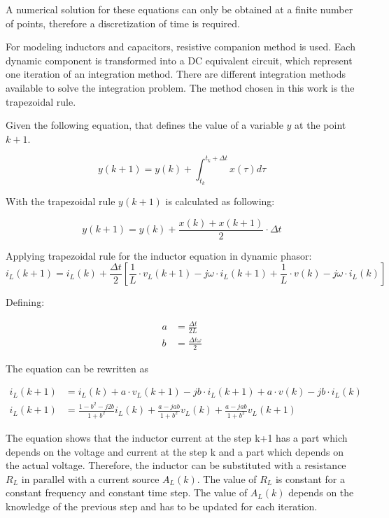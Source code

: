 A numerical solution for these equations can only be obtained at a finite number of points, therefore a discretization of time is required.

For modeling inductors and capacitors, resistive companion method is used. Each dynamic component is transformed into a DC equivalent circuit, which represent one iteration of an integration method.
There are different integration methods available to solve the integration problem. The method chosen in this work is the trapezoidal rule.

Given the following equation, that defines the value of a variable $y$ at the point $k+1$.

\begin{equation}
	y(k+1) = y(k) + \int_{t_k}^{t_k+ \Delta t} x(\tau)d \tau
\end{equation}

With the trapezoidal rule $y(k+1)$ is calculated as following:

\begin{equation}
	y(k+1)=y(k)+ \frac{x(k)+x(k+1)}{2} \cdot \Delta t
\end{equation}

Applying trapezoidal rule for the inductor equation in dynamic phasor:
\begin{equation}
        i_L(k+1) = i_L(k) + \frac{\Delta t}{2} \left[ \frac{1}{L} \cdot v_L(k+1) - j \omega \cdot i_L(k+1) + \frac{1}{L} \cdot v(k) - j \omega \cdot i_L(k) \right]
\end{equation}

Defining:

\begin{align}
	a &= \frac{\Delta t}{2L} \\
	b &= \frac{\Delta t \omega}{2}
\end{align}
		
The equation can be rewritten as

\begin{align}
        i_L(k+1) &= i_L(k) + a \cdot v_L(k+1) - j b \cdot i_L(k+1) + a \cdot v(k) - j b \cdot i_L(k) \\
        i_L(k+1) &= \frac{1-b^2-j2b}{1+b^2}i_L(k) + \frac{a-jab}{1+b^2} v_L(k) + \frac{a-jab}{1+b^2} v_L(k+1)
\end{align}

The equation shows that the inductor current at the step k+1 has a part which depends on the voltage and current at the step k and a part which depends on the actual voltage. Therefore, the inductor can be substituted with a resistance $R_L$ in parallel with a current source $A_L(k)$. The value of $R_L$ is constant for a constant frequency and constant time step. The value of $A_L(k)$ depends on the knowledge of the previous step and has to be updated for each iteration.

